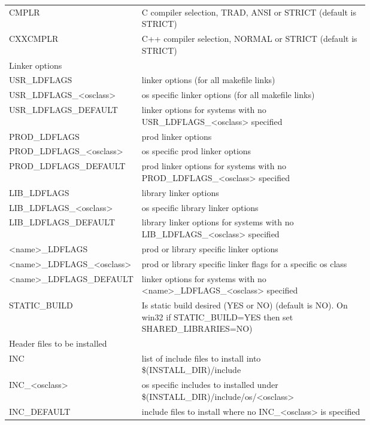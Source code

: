 \begin{center}
\begin{longtable}{lp{0.7\linewidth}}
CMPLR & C compiler selection, TRAD, ANSI or STRICT (default is STRICT)\\
CXXCMPLR & C++ compiler selection, NORMAL or STRICT (default is STRICT)\\
Linker options &    \\
USR\_LDFLAGS & linker options (for all makefile links)\\
USR\_LDFLAGS\_\textless{}osclass\textgreater{} & os specific linker options (for all makefile links)\\
USR\_LDFLAGS\_DEFAULT & linker options for systems with no USR\_LDFLAGS\_\textless{}osclass\textgreater{} specified\\
PROD\_LDFLAGS & prod linker options\\
PROD\_LDFLAGS\_\textless{}osclass\textgreater{} & os specific prod linker options\\
PROD\_LDFLAGS\_DEFAULT & prod linker options for systems with no PROD\_LDFLAGS\_\textless{}osclass\textgreater{} specified\\
LIB\_LDFLAGS & library linker options\\
LIB\_LDFLAGS\_\textless{}osclass\textgreater{} & os specific library linker options\\
LIB\_LDFLAGS\_DEFAULT & library linker options for systems with no LIB\_LDFLAGS\_\textless{}osclass\textgreater{} specified\\
\textless{}name\textgreater{}\_LDFLAGS & prod or library specific linker options\\
\textless{}name\textgreater{}\_LDFLAGS\_\textless{}osclass\textgreater{} & prod or library specific linker flags for a specific os class\\
\textless{}name\textgreater{}\_LDFLAGS\_DEFAULT & linker options for systems with no \textless{}name\textgreater{}\_LDFLAGS\_\textless{}osclass\textgreater{} specified\\
STATIC\_BUILD & Is static build desired (YES or NO) (default is NO). On win32 if STATIC\_BUILD=YES then set SHARED\_LIBRARIES=NO) \\
Header files to be installed &    \\
INC & list of include files to install into \$(INSTALL\_DIR)/include\\
INC\_\textless{}osclass\textgreater{} & os specific includes to installed under \$(INSTALL\_DIR)/include/os/\textless{}osclass\textgreater{}\\
INC\_DEFAULT & include files to install where no INC\_\textless{}osclass\textgreater{} is specified\\

\end{longtable}
\end{center}
